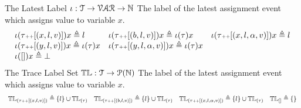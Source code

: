 %
%
The Latest Label $\iota : \mathcal{T} \to \mathcal{VAR} \to \mathbb{N}$ 
The label of the latest assignment event which assigns value to variable $x$.
\[
  \begin{array}{lll}
\iota(\mathtt{\tau}  {\scriptscriptstyle ++} [(x, l, v)]) x \triangleq l
&
\iota(\mathtt{\tau}  {\scriptscriptstyle ++} [(b, l, v)]) x \triangleq \iota(\mathtt{\tau}) x
&
\iota(\mathtt{\tau}  {\scriptscriptstyle ++} [(x, l, \alpha, v)]) x \triangleq l
\\
\iota(\mathtt{\tau}  {\scriptscriptstyle ++} [(y, l, v)]) x \triangleq \iota(\mathtt{\tau} ) x
&
\iota(\mathtt{\tau}  {\scriptscriptstyle ++} [(y, l, \alpha, v)]) x \triangleq \iota(\mathtt{\tau} ) x
\\
\iota({[]}) x \triangleq \bot
&&
\end{array}
\]
%
The Trace Label Set $\mathbb{TL} : \mathcal{T} \to \mathcal{P}{(\mathbb{N})}$ 
The label of the latest assignment event which assigns value to variable $x$.
\[
  \begin{array}{llll}
\mathbb{TL}_{(\mathtt{\tau}  {\scriptscriptstyle ++} [(x, l, v)])} \triangleq \{l\} \cup \mathbb{TL}_{(\mathtt{\tau} )}
&
\mathbb{TL}_{(\mathtt{\tau}  {\scriptscriptstyle ++} [(b, l, v)])} \triangleq \{l\} \cup \mathbb{TL}_{(\mathtt{\tau})}
&
\mathbb{TL}_{(\mathtt{\tau}  {\scriptscriptstyle ++} [(x, l, \alpha, v)])} \triangleq \{l\} \cup \mathbb{TL}_{(\mathtt{\tau})}
&
\mathbb{TL}_{[]} \triangleq \{\}
\end{array}
\]
%
